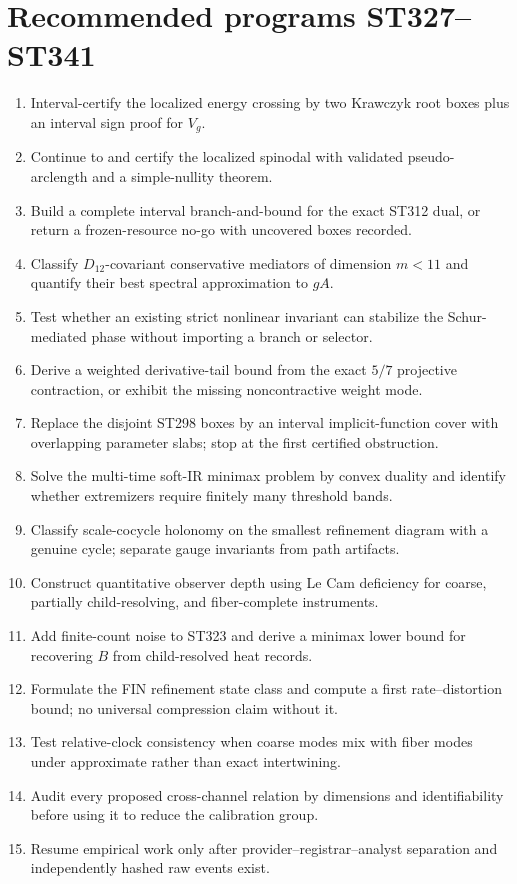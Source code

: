 \documentclass[11pt,a4paper]{article}
\begin{document}
\section{Recommended programs ST327--ST341}
\begin{enumerate}
\item[\textbf{ST327}.] Interval-certify the localized energy crossing by two Krawczyk root
boxes plus an interval sign proof for $V_g$.
\item[\textbf{ST328}.] Continue to and certify the localized spinodal with validated
pseudo-arclength and a simple-nullity theorem.
\item[\textbf{ST329}.] Build a complete interval branch-and-bound for the exact ST312 dual,
or return a frozen-resource no-go with uncovered boxes recorded.
\item[\textbf{ST330}.] Classify $D_{12}$-covariant conservative mediators of dimension
$m<11$ and quantify their best spectral approximation to $gA$.
\item[\textbf{ST331}.] Test whether an existing strict nonlinear invariant can stabilize
the Schur-mediated phase without importing a branch or selector.
\item[\textbf{ST332}.] Derive a weighted derivative-tail bound from the exact $5/7$
projective contraction, or exhibit the missing noncontractive weight mode.
\item[\textbf{ST333}.] Replace the disjoint ST298 boxes by an interval implicit-function
cover with overlapping parameter slabs; stop at the first certified obstruction.
\item[\textbf{ST334}.] Solve the multi-time soft-IR minimax problem by convex duality and
identify whether extremizers require finitely many threshold bands.
\item[\textbf{ST335}.] Classify scale-cocycle holonomy on the smallest refinement diagram
with a genuine cycle; separate gauge invariants from path artifacts.
\item[\textbf{ST336}.] Construct quantitative observer depth using Le Cam deficiency for
coarse, partially child-resolving, and fiber-complete instruments.
\item[\textbf{ST337}.] Add finite-count noise to ST323 and derive a minimax lower bound for
recovering $B$ from child-resolved heat records.
\item[\textbf{ST338}.] Formulate the FIN refinement state class and compute a first
rate--distortion bound; no universal compression claim without it.
\item[\textbf{ST339}.] Test relative-clock consistency when coarse modes mix with fiber
modes under approximate rather than exact intertwining.
\item[\textbf{ST340}.] Audit every proposed cross-channel relation by dimensions and
identifiability before using it to reduce the calibration group.
\item[\textbf{ST341}.] Resume empirical work only after provider--registrar--analyst
separation and independently hashed raw events exist.
\end{enumerate}
\end{document}
